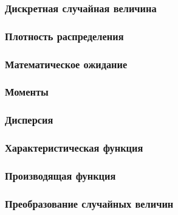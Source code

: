 \subsubsection{Дискретная случайная величина}
\subsubsection{Плотность распределения}
\subsubsection{Математическое ожидание}
\subsubsection{Моменты}
\subsubsection{Дисперсия}
\subsubsection{Характеристическая функция}
\subsubsection{Производящая функция}
\subsubsection{Преобразование случайных величин}
